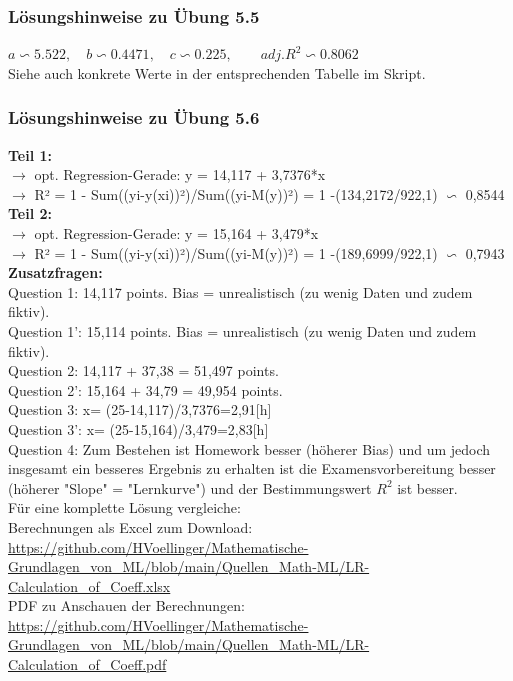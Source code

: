 \documentclass[12pt]{article}
\begin{document}
\subsubsection{Lösungshinweise zu Übung 5.5}
%
$ a \backsim 5.522, \quad b \backsim 0.4471, \quad c \backsim 0.225, \qquad adj.R^2 \backsim 0.8062 $\\[0.2cm]
Siehe auch konkrete Werte in der entsprechenden Tabelle im Skript.
%
\subsubsection{Lösungshinweise zu Übung 5.6}
%
\textbf{Teil 1:}\\
$\rightarrow$ opt. Regression-Gerade:  y =  14,117 + 3,7376*x \\[0.3cm]
$\rightarrow$ R² = 1 - Sum((yi-y(xi))²)/Sum((yi-M(y))²) = 1 -(134,2172/922,1) $\backsim $ 0,8544 \\[0.3cm]	
%				
\textbf{Teil 2:}\\
$\rightarrow$ opt. Regression-Gerade:  y =  15,164 + 3,479*x \\[0.3cm]
$\rightarrow$ R² = 1 - Sum((yi-y(xi))²)/Sum((yi-M(y))²) = 1 -(189,6999/922,1) $\backsim $ 0,7943 \\[0.3cm]	
%				
							
\textbf{Zusatzfragen:}\\
%
Question 1:   14,117 points. Bias = unrealistisch (zu wenig Daten und zudem fiktiv).	\\[0.1cm]
Question 1': 15,114 points. Bias = unrealistisch (zu wenig Daten und zudem fiktiv).	\\[0.1cm]		
Question 2:  14,117 + 37,38 = 51,497 points.\\[0.1cm]
Question 2': 15,164 + 34,79 = 49,954 points.\\[0.1cm]		
Question 3:  x= (25-14,117)/3,7376=2,91[h] \\[0.3cm]	
Question 3': x= (25-15,164)/3,479=2,83[h] \\[0.3cm]	
Question 4: Zum Bestehen ist Homework besser (höherer Bias) und um jedoch insgesamt ein besseres Ergebnis zu erhalten ist die Examensvorbereitung besser (höherer "Slope" = "Lernkurve") und der Bestimmungswert $R^2$ ist besser.\\[0.3cm]	
%
\hspace*{0.0cm}Für eine komplette Lösung vergleiche:\\
Berechnungen als Excel zum Download: \url{https://github.com/HVoellinger/Mathematische-Grundlagen_von_ML/blob/main/Quellen_Math-ML/LR-Calculation_of_Coeff.xlsx}\\
PDF zu Anschauen der Berechnungen: \url{https://github.com/HVoellinger/Mathematische-Grundlagen_von_ML/blob/main/Quellen_Math-ML/LR-Calculation_of_Coeff.pdf}\\
\end{document}
